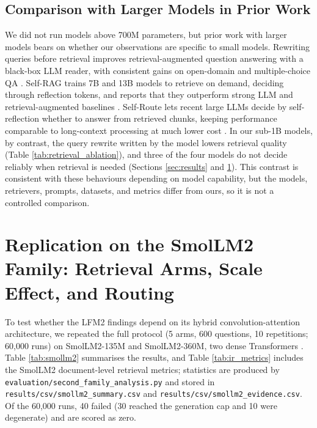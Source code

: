\documentclass[10pt]{article}
\begin{document}
\subsection{Comparison with Larger Models in Prior Work}
\label{sec:larger_models}
We did not run models above 700M parameters, but prior work with larger models bears on whether our observations are specific to small models. Rewriting queries before retrieval improves retrieval-augmented question answering with a black-box LLM reader, with consistent gains on open-domain and multiple-choice QA \citep{ma2023query}. Self-RAG trains 7B and 13B models to retrieve on demand, deciding through reflection tokens, and reports that they outperform strong LLM and retrieval-augmented baselines \citep{asai2023self}. Self-Route lets recent large LLMs decide by self-reflection whether to answer from retrieved chunks, keeping performance comparable to long-context processing at much lower cost \citep{li2024retrieval}. In our sub-1B models, by contrast, the query rewrite written by the model lowers retrieval quality (Table \ref{tab:retrieval_ablation}), and three of the four models do not decide reliably when retrieval is needed (Sections \ref{sec:results} and \ref{sec:smollm2}). This contrast is consistent with these behaviours depending on model capability, but the models, retrievers, prompts, datasets, and metrics differ from ours, so it is not a controlled comparison.

\section{Replication on the SmolLM2 Family: Retrieval Arms, Scale Effect, and Routing}
\label{sec:smollm2}

To test whether the LFM2 findings depend on its hybrid convolution-attention architecture, we repeated the full protocol (5 arms, 600 questions, 10 repetitions; 60,000 runs) on SmolLM2-135M and SmolLM2-360M, two dense Transformers \citep{allal2025smollm2}. Table \ref{tab:smollm2} summarises the results, and Table \ref{tab:ir_metrics} includes the SmolLM2 document-level retrieval metrics; statistics are produced by \texttt{evaluation/second\_family\_analysis.py} and stored in \texttt{results/csv/smollm2\_summary.csv} and \texttt{results/csv/smollm2\_evidence.csv}. Of the 60,000 runs, 40 failed (30 reached the generation cap and 10 were degenerate) and are scored as zero.
\end{document}
